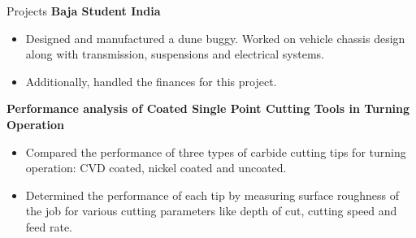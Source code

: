 \documentclass{resume}
\begin{document}
\begin{rSection}{Projects}
{\bf Baja Student India}
\vspace{-0.70em}
\begin{itemize}
 \setlength\itemsep{-0.65em}
    \item Designed and manufactured a dune buggy. Worked on vehicle chassis design along with transmission, suspensions and electrical systems.
    \item Additionally, handled the finances for this project.
\end{itemize}

{\bf Performance analysis of Coated Single Point Cutting Tools in Turning Operation}
\vspace{-0.70em}
\begin{itemize}
 \setlength\itemsep{-0.65em}
    \item Compared the performance of three types of carbide cutting tips for turning operation: CVD coated, nickel coated and uncoated.
    \item Determined the performance of each tip by measuring surface roughness of the job for various cutting parameters like depth of cut, cutting speed and feed rate.
\end{itemize}





\end{rSection}
\end{document}
